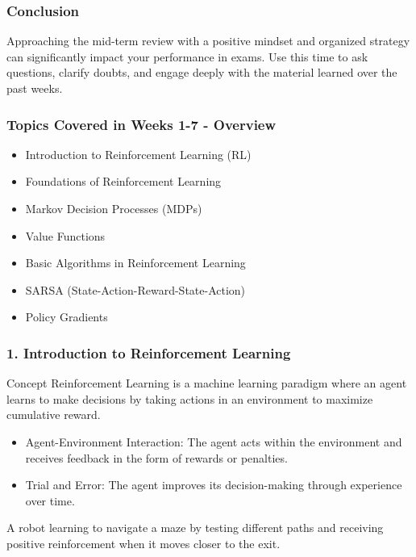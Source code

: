\documentclass{beamer}
\begin{document}
\begin{frame}[fragile]
    \frametitle{Conclusion}
    Approaching the mid-term review with a positive mindset and organized strategy can significantly impact your performance in exams. Use this time to ask questions, clarify doubts, and engage deeply with the material learned over the past weeks.
\end{frame}

\begin{frame}[fragile]
    \frametitle{Topics Covered in Weeks 1-7 - Overview}
    \begin{itemize}
        \item Introduction to Reinforcement Learning (RL)
        \item Foundations of Reinforcement Learning
        \item Markov Decision Processes (MDPs)
        \item Value Functions
        \item Basic Algorithms in Reinforcement Learning
        \item SARSA (State-Action-Reward-State-Action)
        \item Policy Gradients
    \end{itemize}
\end{frame}

\begin{frame}[fragile]
    \frametitle{1. Introduction to Reinforcement Learning}
    \begin{block}{Concept}
        Reinforcement Learning is a machine learning paradigm where an agent learns to make decisions by taking actions in an environment to maximize cumulative reward.
    \end{block}
    \begin{itemize}
        \item Agent-Environment Interaction: The agent acts within the environment and receives feedback in the form of rewards or penalties.
        \item Trial and Error: The agent improves its decision-making through experience over time.
    \end{itemize}
    \begin{example}
        A robot learning to navigate a maze by testing different paths and receiving positive reinforcement when it moves closer to the exit.
    \end{example}
\end{frame}
\end{document}

